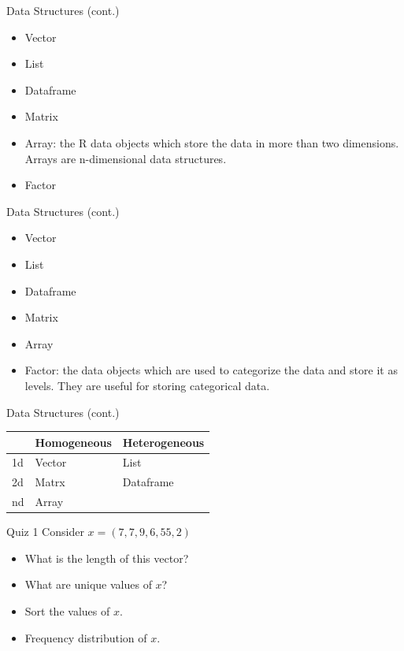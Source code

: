 \documentclass{beamer}
\begin{document}
\begin{frame}{Data Structures (cont.)}
\begin{itemize}
    \item Vector
    \item List
    \item Dataframe
    \item Matrix
    \item Array: the R data objects which store the data in more than two dimensions. Arrays are n-dimensional data structures.
    \item Factor
\end{itemize}
    
\end{frame}

\begin{frame}{Data Structures (cont.)}
\begin{itemize}
    \item Vector
    \item List
    \item Dataframe
    \item Matrix
    \item Array
    \item Factor: the data objects which are used to categorize the data and store it as levels. They are useful for storing categorical data.
\end{itemize}
    
\end{frame}

\begin{frame}{Data Structures (cont.)}
\begin{table}[]
\begin{tabular}{lll}
   & Homogeneous & Heterogeneous \\ \hline
1d & Vector     & List         \\ \hline
2d & Matrx   & Dataframe    \\ \hline
nd & Array       &              
\end{tabular}
\end{table}
    
\end{frame}

\begin{frame}{Quiz 1}
    Consider $x = (7,7,9,6,55,2)$\\
    \begin{itemize}
        \item What is the length of this vector?
        \item What are unique values of $x$?
        \item Sort the values of $x$.
        \item Frequency distribution of $x$.
    \end{itemize}
\end{frame}
\end{document}
